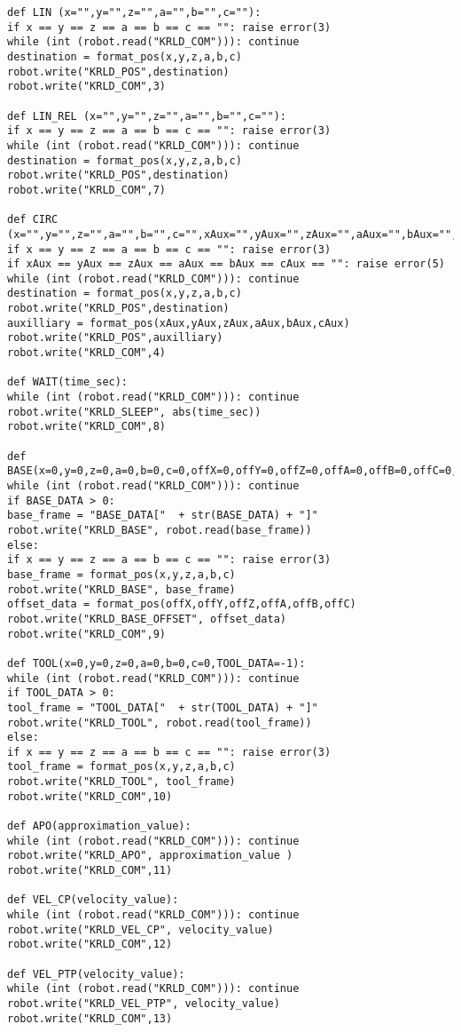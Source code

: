 \begin{lstlisting}[language=terCmd]
def LIN (x="",y="",z="",a="",b="",c=""):
if x == y == z == a == b == c == "": raise error(3)
while (int (robot.read("KRLD_COM"))): continue
destination = format_pos(x,y,z,a,b,c)
robot.write("KRLD_POS",destination)
robot.write("KRLD_COM",3)

def LIN_REL (x="",y="",z="",a="",b="",c=""):
if x == y == z == a == b == c == "": raise error(3)
while (int (robot.read("KRLD_COM"))): continue
destination = format_pos(x,y,z,a,b,c)
robot.write("KRLD_POS",destination)
robot.write("KRLD_COM",7)

def CIRC (x="",y="",z="",a="",b="",c="",xAux="",yAux="",zAux="",aAux="",bAux="",cAux=""):
if x == y == z == a == b == c == "": raise error(3)
if xAux == yAux == zAux == aAux == bAux == cAux == "": raise error(5)
while (int (robot.read("KRLD_COM"))): continue
destination = format_pos(x,y,z,a,b,c)
robot.write("KRLD_POS",destination)
auxilliary = format_pos(xAux,yAux,zAux,aAux,bAux,cAux)
robot.write("KRLD_POS",auxilliary)
robot.write("KRLD_COM",4)

def WAIT(time_sec):
while (int (robot.read("KRLD_COM"))): continue
robot.write("KRLD_SLEEP", abs(time_sec))
robot.write("KRLD_COM",8)

def BASE(x=0,y=0,z=0,a=0,b=0,c=0,offX=0,offY=0,offZ=0,offA=0,offB=0,offC=0,BASE_DATA=-1):
while (int (robot.read("KRLD_COM"))): continue
if BASE_DATA > 0: 
base_frame = "BASE_DATA["  + str(BASE_DATA) + "]"
robot.write("KRLD_BASE", robot.read(base_frame))	
else:
if x == y == z == a == b == c == "": raise error(3)
base_frame = format_pos(x,y,z,a,b,c)
robot.write("KRLD_BASE", base_frame)
offset_data = format_pos(offX,offY,offZ,offA,offB,offC)
robot.write("KRLD_BASE_OFFSET", offset_data)
robot.write("KRLD_COM",9)

def TOOL(x=0,y=0,z=0,a=0,b=0,c=0,TOOL_DATA=-1):
while (int (robot.read("KRLD_COM"))): continue
if TOOL_DATA > 0: 
tool_frame = "TOOL_DATA["  + str(TOOL_DATA) + "]" 
robot.write("KRLD_TOOL", robot.read(tool_frame))
else:
if x == y == z == a == b == c == "": raise error(3)
tool_frame = format_pos(x,y,z,a,b,c)
robot.write("KRLD_TOOL", tool_frame)
robot.write("KRLD_COM",10)

def APO(approximation_value):
while (int (robot.read("KRLD_COM"))): continue
robot.write("KRLD_APO", approximation_value )
robot.write("KRLD_COM",11)

def VEL_CP(velocity_value):
while (int (robot.read("KRLD_COM"))): continue
robot.write("KRLD_VEL_CP", velocity_value)
robot.write("KRLD_COM",12)

def VEL_PTP(velocity_value):
while (int (robot.read("KRLD_COM"))): continue
robot.write("KRLD_VEL_PTP", velocity_value)
robot.write("KRLD_COM",13)


\end{lstlisting}
